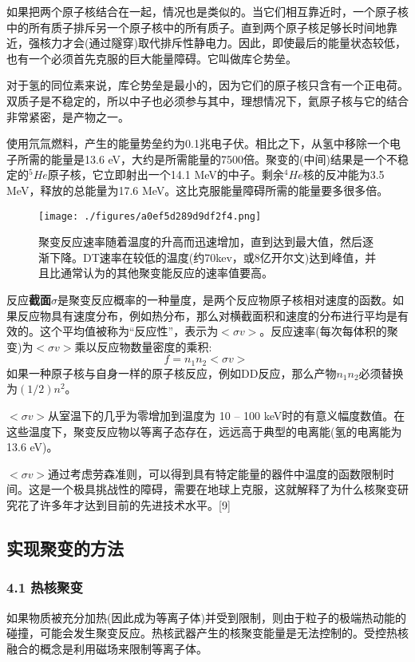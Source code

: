 如果把两个原子核结合在一起，情况也是类似的。当它们相互靠近时，一个原子核中的所有质子排斥另一个原子核中的所有质子。直到两个原子核足够长时间地靠近，强核力才会(通过隧穿)取代排斥性静电力。因此，即使最后的能量状态较低，也有一个必须首先克服的巨大能量障碍。它叫做库仑势垒。

对于氢的同位素来说，库仑势垒是最小的，因为它们的原子核只含有一个正电荷。双质子是不稳定的，所以中子也必须参与其中，理想情况下，氦原子核与它的结合非常紧密，是产物之一。

使用氘氚燃料，产生的能量势垒约为0.1兆电子伏。相比之下，从氢中移除一个电子所需的能量是13.6 eV，大约是所需能量的7500倍。聚变的(中间)结果是一个不稳定的$^{5}He$原子核，它立即射出一个14.1 MeV的中子。剩余$^{4}He$核的反冲能为3.5 MeV，释放的总能量为17.6 MeV。这比克服能量障碍所需的能量要多很多倍。
\begin{figure}[ht]
\centering
\texttt{[image: ./figures/a0ef5d289d9df2f4.png]}
\caption{聚变反应速率随着温度的升高而迅速增加，直到达到最大值，然后逐渐下降。DT速率在较低的温度(约70kev，或8亿开尔文)达到峰值，并且比通常认为的其他聚变能反应的速率值要高。} \label{fig_HJB_5}
\end{figure}
反应\textbf{截面$\sigma$}是聚变反应概率的一种量度，是两个反应物原子核相对速度的函数。如果反应物具有速度分布，例如热分布，那么对横截面积和速度的分布进行平均是有效的。这个平均值被称为“反应性”，表示为$<\sigma v >$。反应速率(每次每体积的聚变)为$<\sigma v >$乘以反应物数量密度的乘积:
$$f=n_1n_2<\sigma v>~$$
如果一种原子核与自身一样的原子核反应，例如DD反应，那么产物$n_1n_2$必须替换为$(1/2)n^2$。

$<\sigma v >$从室温下的几乎为零增加到温度为 10 – 100 keV时的有意义幅度数值。在这些温度下，聚变反应物以等离子态存在，远远高于典型的电离能(氢的电离能为13.6 eV)。

$<\sigma v >$通过考虑劳森准则，可以得到具有特定能量的器件中温度的函数限制时间。这是一个极具挑战性的障碍，需要在地球上克服，这就解释了为什么核聚变研究花了许多年才达到目前的先进技术水平。[9]

\subsection{实现聚变的方法}
\subsubsection{4.1 热核聚变}
如果物质被充分加热(因此成为等离子体)并受到限制，则由于粒子的极端热动能的碰撞，可能会发生聚变反应。热核武器产生的核聚变能量是无法控制的。受控热核融合的概念是利用磁场来限制等离子体。
